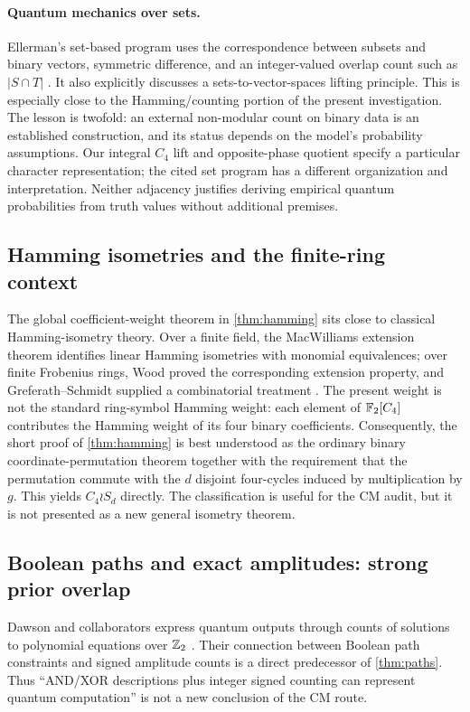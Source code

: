 \paragraph{Quantum mechanics over sets.}
Ellerman's set-based program uses the correspondence between subsets and binary vectors, symmetric difference, and an integer-valued overlap count such as $|S\cap T|$ \cite{ellerman}. It also explicitly discusses a sets-to-vector-spaces lifting principle. This is especially close to the Hamming/counting portion of the present investigation. The lesson is twofold: an external non-modular count on binary data is an established construction, and its status depends on the model's probability assumptions. Our integral $C_4$ lift and opposite-phase quotient specify a particular character representation; the cited set program has a different organization and interpretation. Neither adjacency justifies deriving empirical quantum probabilities from truth values without additional premises.


\subsection{Hamming isometries and the finite-ring context}
The global coefficient-weight theorem in \cref{thm:hamming} sits close to classical Hamming-isometry theory.  Over a finite field, the MacWilliams extension theorem identifies linear Hamming isometries with monomial equivalences; over finite Frobenius rings, Wood proved the corresponding extension property, and Greferath--Schmidt supplied a combinatorial treatment \cite{wood1999,greferath2000}.  The present weight is not the standard ring-symbol Hamming weight: each element of $\mathbb F_2[C_4]$ contributes the Hamming weight of its four binary coefficients.  Consequently, the short proof of \cref{thm:hamming} is best understood as the ordinary binary coordinate-permutation theorem together with the requirement that the permutation commute with the $d$ disjoint four-cycles induced by multiplication by $g$.  This yields $C_4\wr S_d$ directly.  The classification is useful for the CM audit, but it is not presented as a new general isometry theorem.

\subsection{Boolean paths and exact amplitudes: strong prior overlap}
Dawson and collaborators express quantum outputs through counts of solutions to polynomial equations over $\mathbb Z_2$ \cite{dawson}. Their connection between Boolean path constraints and signed amplitude counts is a direct predecessor of \cref{thm:paths}. Thus ``AND/XOR descriptions plus integer signed counting can represent quantum computation'' is not a new conclusion of the CM route.

